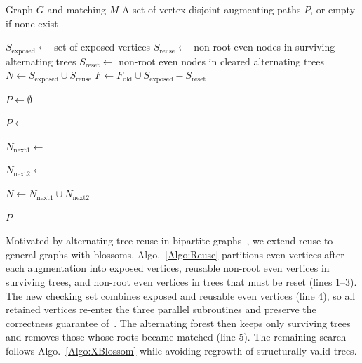 \begin{algorithm}[!htbp]
  \footnotesize
  \captionsetup{font = footnotesize}
  \caption{Parallel Augmenting-Path Search Procedure with Reusable Alternating Trees in X-Blossom-Pro}
  \label{Algo:Reuse}
  \begin{algorithmic}[1]

  \Require Graph $G$ and matching $M$
  \Ensure A set of vertex-disjoint augmenting paths $P$, or empty if none exist

  \State $S_{\text{exposed}} \gets $ set of exposed vertices
  \State $S_{\text{reuse}} \gets $ non-root even nodes in surviving alternating trees
  \State $S_{\text{reset}} \gets $ non-root even nodes in cleared alternating trees
  \State $N \gets  S_{\text{exposed}} \cup S_{\text{reuse}} $
  \State $F \gets F_\text{old} \cup S_{\text{exposed}} - S_{\text{reset}}$
 
  \State $P \gets \emptyset$
  

      \State $P \gets$ 

      \State $N_{\text{next1}} \gets$ 

      \State $N_{\text{next2}} \gets$ 
      
      \State $N \gets N_{\text{next1}} \cup N_{\text{next2}}$

  \EndWhile
  
  \State \Return $P$

  \end{algorithmic}
\end{algorithm}

Motivated by alternating-tree reuse in bipartite graphs~\cite{akathoott2025bidirectional}, we extend reuse to general graphs with blossoms.
Algo.~\ref{Algo:Reuse} partitions even vertices after each augmentation into exposed vertices, reusable non-root even vertices in surviving trees, and non-root even vertices in trees that must be reset (lines 1--3).
The new checking set combines exposed and reusable even vertices (line 4), so all retained vertices re-enter the three parallel subroutines and preserve the correctness guarantee of~\cite{fan2025x}.
The alternating forest then keeps only surviving trees and removes those whose roots became matched (line 5).
The remaining search follows Algo.~\ref{Algo:XBlossom} while avoiding regrowth of structurally valid trees.


